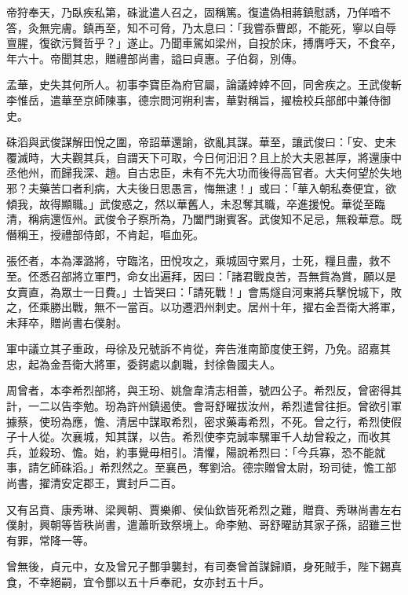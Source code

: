 \begin{pinyinscope}
 帝狩奉天，乃臥疾私第，硃泚遣人召之，固稱篤。復遣偽相蔣鎮慰誘，乃佯喑不答，灸無完膚。鎮再至，知不可脅，乃太息曰：「我嘗忝曹郎，不能死，寧以自辱亶腥，復欲污賢哲乎？」遂止。乃聞車駕如梁州，自投於床，搏膺呼天，不食卒，年六十。帝聞其忠，贈禮部尚書，謚曰貞惠。子伯芻，別傳。



 孟華，史失其何所人。初事李寶臣為府官屬，論議婞婞不回，同舍疾之。王武俊斬李惟岳，遣華至京師陳事，德宗問河朔利害，華對稱旨，擢檢校兵部郎中兼侍御史。



 硃滔與武俊謀解田悅之圍，帝詔華還諭，欲亂其謀。華至，讓武俊曰：「安、史未覆滅時，大夫觀其兵，自謂天下可取，今日何汩汩？且上於大夫恩甚厚，將還康中丞他州，而歸我深、趙。自古忠臣，未有不先大功而後得高官者。大夫何望於失地邪？夫藥苦口者利病，大夫後日思愚言，悔無逮！」或曰：「華入朝私奏便宜，欲傾我，故得顯職。」武俊惑之，然以華舊人，未忍奪其職，卒進援悅。華從至臨清，稱病還恆州。武俊令子察所為，乃闔門謝賓客。武俊知不足忌，無殺華意。既僭稱王，授禮部侍郎，不肯起，嘔血死。



 張伾者，本為澤潞將，守臨洺，田悅攻之，乘城固守累月，士死，糧且盡，救不至。伾悉召部將立軍門，命女出遍拜，因曰：「諸君戰良苦，吾無貲為賞，願以是女賣直，為眾士一日費。」士皆哭曰：「請死戰！」會馬燧自河東將兵擊悅城下，敗之，伾乘勝出戰，無不一當百。以功遷泗州刺史。居州十年，擢右金吾衛大將軍，未拜卒，贈尚書右僕射。



 軍中議立其子重政，母徐及兄號訴不肯從，奔告淮南節度使王鍔，乃免。詔嘉其忠，起為金吾衛大將軍，委鍔處以劇職，封徐魯國夫人。



 周曾者，本李希烈部將，與王玢、姚詹韋清志相善，號四公子。希烈反，曾密得其計，一二以告李勉。玢為許州鎮遏使。會哥舒曜拔汝州，希烈遣曾往拒。曾欲引軍據蔡，使玢為應，憺、清居中謀取希烈，密求藥毒希烈，不死。曾之行，希烈使假子十人從。次襄城，知其謀，以告。希烈使李克誠率騾軍千人劫曾殺之，而收其兵，並殺玢、憺。始，約事覺毋相引。清懼，陽說希烈曰：「今兵寡，恐不能就事，請乞師硃滔。」希烈然之。至襄邑，奪劉洽。德宗贈曾太尉，玢司徒，憺工部尚書，擢清安定郡王，實封戶二百。



 又有呂賁、康秀琳、梁興朝、賈樂卿、侯仙欽皆死希烈之難，贈賁、秀琳尚書左右僕射，興朝等皆秩尚書，遣蕭昕致祭境上。命李勉、哥舒曜訪其家子孫，詔雖三世有罪，常降一等。



 曾無後，貞元中，女及曾兄子酆爭襲封，有司奏曾首謀歸順，身死賊手，陛下錫真食，不幸絕嗣，宜令酆以五十戶奉祀，女亦封五十戶。




\end{pinyinscope}
